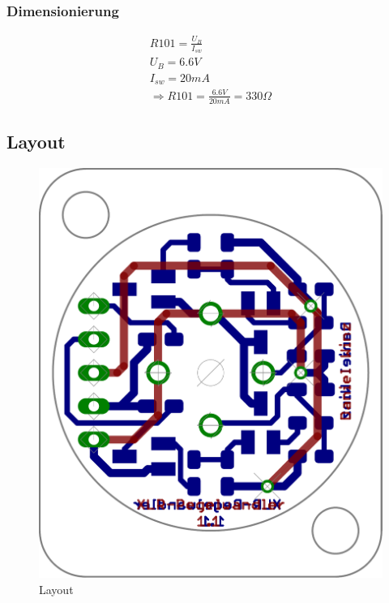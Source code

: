 \subsubsection{Dimensionierung}
\[ \begin{matrix} R101 = \frac{U_B}{I_{sw}}\\
U_B = 6.6 V\\
I_{sw} = 20 mA\\
\Rightarrow R101 = \frac{6.6V}{20mA} = 330 \Omega
\end{matrix} \]

\subsection{Layout}
\begin{figure}[h!]
	\centering
	\includegraphics[scale=\schscale]{fig/xlr_pegelwandler_v_1_1_lay_transp.pdf}
	\caption{Layout}
	\label{lay:pegw}
\end{figure}
